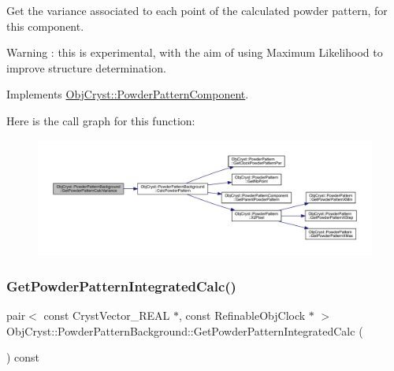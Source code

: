 Get the variance associated to each point of the calculated powder pattern, for this component.

\begin{DoxyWarning}{Warning}
\+: this is experimental, with the aim of using Maximum Likelihood to improve structure determination. 
\end{DoxyWarning}


Implements \mbox{\hyperlink{class_obj_cryst_1_1_powder_pattern_component_ad67b39669fd0d336b01937ee81a59ddc}{Obj\+Cryst\+::\+Powder\+Pattern\+Component}}.

Here is the call graph for this function\+:
\nopagebreak
\begin{figure}[H]
\begin{center}
\leavevmode
\includegraphics[width=350pt]{class_obj_cryst_1_1_powder_pattern_background_a75c931bd3e0370e7434f75d70ba51295_cgraph}
\end{center}
\end{figure}
\mbox{\label{class_obj_cryst_1_1_powder_pattern_background_add12004ddfd2cc22d4fe0c52304da709}} 
\subsubsection{\texorpdfstring{GetPowderPatternIntegratedCalc()}{GetPowderPatternIntegratedCalc()}}
{\footnotesize\ttfamily pair$<$ const Cryst\+Vector\+\_\+\+R\+E\+AL $\ast$, const Refinable\+Obj\+Clock $\ast$ $>$ Obj\+Cryst\+::\+Powder\+Pattern\+Background\+::\+Get\+Powder\+Pattern\+Integrated\+Calc (\begin{DoxyParamCaption}{ }\end{DoxyParamCaption}) const\hspace{0.3cm}{\ttfamily [virtual]}}

